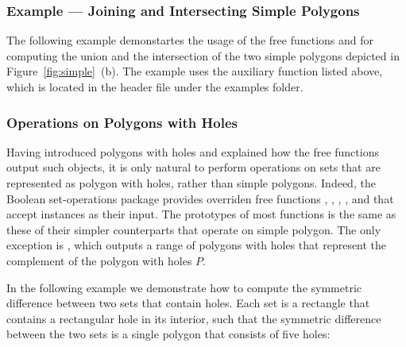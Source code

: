 \subsubsection{Example --- Joining and Intersecting Simple Polygons}
\label{bops_sssec:ex_simple_bops}

The following example demonstartes the usage of the free functions
 and  for computing the union and the
intersection of the two simple polygons depicted in
Figure~\ref{fig:simple}~(b). The example uses the auxiliary function
 listed above, which is located in
the header file  under the examples folder.


\subsubsection{Operations on Polygons with Holes}
\label{bops_sssec:pwh_bops}

Having introduced polygons with holes and explained how the free functions
output such objects, it is only natural to perform operations on sets that
are represented as polygon with holes, rather than simple polygons.
Indeed, the Boolean set-operations package provides overriden free functions
, , , ,
 and  that accept
 instances as their input. The prototypes of
most functions is the same as these of their simpler counterparts that operate
on simple polygon. The only exception is , which
outputs a range of polygons with holes that represent the complement of the
polygon with holes $P$.

In the following example we demonstrate how to compute the symmetric
difference between two sets that contain holes. Each set is a rectangle that
contains a rectangular hole in its interior, such that the symmetric
difference between the two sets is a single polygon that consists of five
holes:


